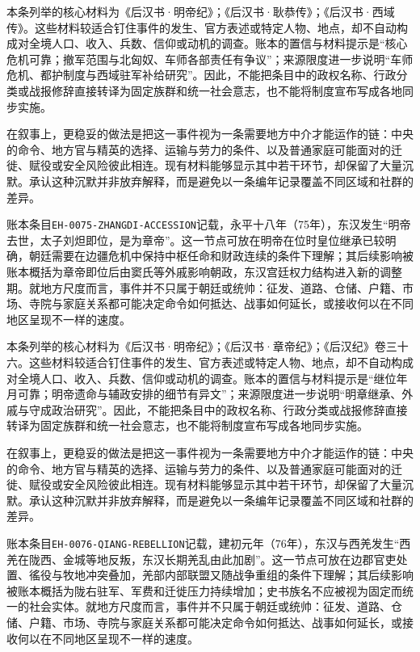 本条列举的核心材料为《后汉书·明帝纪》；《后汉书·耿恭传》；《后汉书·西域传》。这些材料较适合钉住事件的发生、官方表述或特定人物、地点，却不自动构成对全境人口、收入、兵数、信仰或动机的调查。账本的置信与材料提示是“核心危机可靠；撤军范围与北匈奴、车师各部责任有争议”；来源限度进一步说明“车师危机、都护制度与西域驻军补给研究”。因此，不能把条目中的政权名称、行政分类或战报修辞直接转译为固定族群和统一社会意志，也不能将制度宣布写成各地同步实施。

在叙事上，更稳妥的做法是把这一事件视为一条需要地方中介才能运作的链：中央的命令、地方官与精英的选择、运输与劳力的条件、以及普通家庭可能面对的迁徙、赋役或安全风险彼此相连。现有材料能够显示其中若干环节，却保留了大量沉默。承认这种沉默并非放弃解释，而是避免以一条编年记录覆盖不同区域和社群的差异。

账本条目\texttt{EH-0075-ZHANGDI-ACCESSION}记载，永平十八年（75年），东汉发生“明帝去世，太子刘炟即位，是为章帝”。这一节点可放在明帝在位时皇位继承已较明确，朝廷需要在边疆危机中保持中枢任命和财政连续的条件下理解；其后续影响被账本概括为章帝即位后由窦氏等外戚影响朝政，东汉宫廷权力结构进入新的调整期。就地方尺度而言，事件并不只属于朝廷或统帅：征发、道路、仓储、户籍、市场、寺院与家庭关系都可能决定命令如何抵达、战事如何延长，或接收何以在不同地区呈现不一样的速度。

本条列举的核心材料为《后汉书·明帝纪》；《后汉书·章帝纪》；《后汉纪》卷三十六。这些材料较适合钉住事件的发生、官方表述或特定人物、地点，却不自动构成对全境人口、收入、兵数、信仰或动机的调查。账本的置信与材料提示是“继位年月可靠；明帝遗命与辅政安排的细节有异文”；来源限度进一步说明“明章继承、外戚与守成政治研究”。因此，不能把条目中的政权名称、行政分类或战报修辞直接转译为固定族群和统一社会意志，也不能将制度宣布写成各地同步实施。

在叙事上，更稳妥的做法是把这一事件视为一条需要地方中介才能运作的链：中央的命令、地方官与精英的选择、运输与劳力的条件、以及普通家庭可能面对的迁徙、赋役或安全风险彼此相连。现有材料能够显示其中若干环节，却保留了大量沉默。承认这种沉默并非放弃解释，而是避免以一条编年记录覆盖不同区域和社群的差异。

账本条目\texttt{EH-0076-QIANG-REBELLION}记载，建初元年（76年），东汉与西羌发生“西羌在陇西、金城等地反叛，东汉长期羌乱由此加剧”。这一节点可放在边郡官吏处置、徭役与牧地冲突叠加，羌部内部联盟又随战争重组的条件下理解；其后续影响被账本概括为陇右驻军、军费和迁徙压力持续增加；史书族名不应被视为固定而统一的社会实体。就地方尺度而言，事件并不只属于朝廷或统帅：征发、道路、仓储、户籍、市场、寺院与家庭关系都可能决定命令如何抵达、战事如何延长，或接收何以在不同地区呈现不一样的速度。

